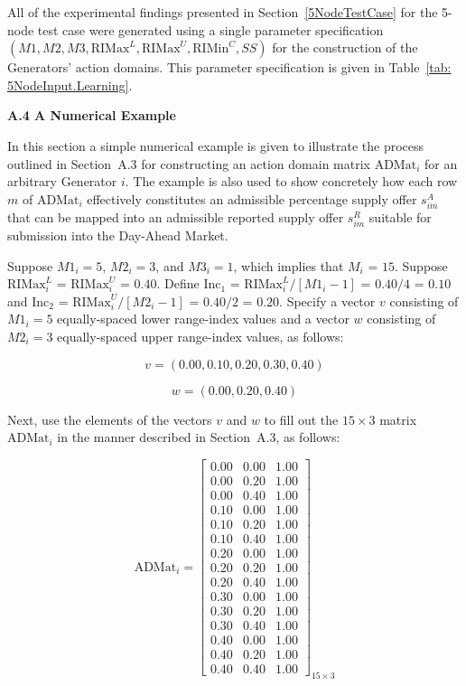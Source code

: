 \documentclass[12pt]{article}
\begin{document}
All of the experimental findings presented in Section~\ref{5NodeTestCase} for the 5-node test case 
were generated using a single parameter specification 
$(M1,M2,M3,\mbox{RIMax}^L,\mbox{RIMax}^U,\mbox{RIMin}^C,SS)$ for the construction of 
the Generators' action domains. This parameter specification is given in Table~\ref{tab: 5NodeInput.Learning}.



\bigskip
\noindent
\textbf{\large A.4 A Numerical Example}

\medskip
\noindent
In this section a simple numerical example is given to illustrate the process outlined in Section~A.3 for constructing an action domain matrix $\mbox{ADMat}_i$ for an arbitrary Generator $i$.  The example is also used to show concretely how each row $m$ of $\mbox{ADMat}_i$ effectively constitutes an admissible percentage supply offer $s^A_{im}$ that can be mapped into an admissible reported supply offer $s^R_{im}$ suitable for submission into the Day-Ahead Market.  

Suppose $M1_i = 5$, $M2_i = 3$, and $M3_i=1$, which implies that $M_i$ = $15$.  Suppose $\mbox{RIMax}^L_i$ = 
$\mbox{RIMax}^U_i$ = $0.40$.  Define $\mbox{Inc}_1$ = $\mbox{RIMax}^L_i/[M1_i -1]$ = $0.40/4$ = $0.10$ and 
$\mbox{Inc}_2$ = $\mbox{RIMax}^U_i/[M2_i-1]$ = $0.40/2$ = $0.20$.  Specify a vector $v$ consisting of $M1_i = 5$ equally-spaced lower range-index values and a vector $w$ consisting of $M2_i = 3$ equally-spaced upper range-index values, as follows:

\[v = (0.00,0.10, 0.20, 0.30,0.40)\] 

\[w =( 0.00,0.20,0.40)\]

Next, use the elements of the vectors $v$ and $w$ to fill out the $15 \times 3$ matrix $\mbox{ADMat}_i$ in the manner described in Section~A.3, as follows:

\[ \mbox{ADMat}_i = \left[ \begin{array}{lll}
						 0.00 & 0.00 & 1.00\\
						 0.00 & 0.20 & 1.00\\
						 0.00 & 0.40 & 1.00\\
						 0.10 & 0.00 & 1.00\\
						 0.10 & 0.20 & 1.00\\
						 0.10 & 0.40 & 1.00\\
						 0.20 & 0.00 & 1.00\\
						 0.20 & 0.20 & 1.00\\
						 0.20 & 0.40 & 1.00\\
						 0.30 & 0.00 & 1.00\\
						 0.30 & 0.20 & 1.00\\
						 0.30 & 0.40 & 1.00\\
					 	 0.40 & 0.00 & 1.00\\
						 0.40 & 0.20 & 1.00\\
						 0.40 & 0.40 & 1.00  \end{array} \right]_{15\times 3}
\]
\end{document}
